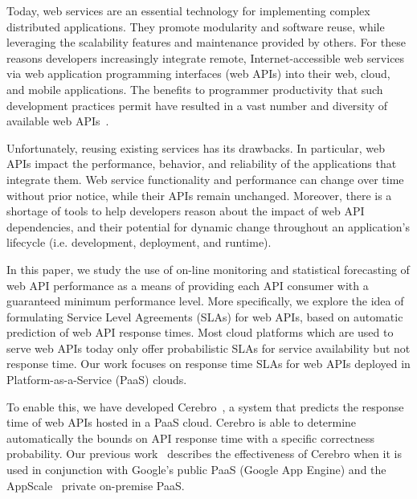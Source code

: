 Today, web services are an essential technology for implementing
complex distributed applications. They promote modularity and software reuse,
while leveraging the scalability features and maintenance 
provided by others. For these reasons developers increasingly integrate remote, 
Internet-accessible web services via web application programming interfaces (web APIs)
into their web, cloud, and mobile applications.  
The benefits to programmer productivity that such development practices
permit have resulted in a vast number and diversity of available web APIs~\cite{pweb}.

Unfortunately, reusing existing services has its drawbacks. In particular, 
web APIs impact the performance, behavior, and reliability of the applications
that integrate them.  Web service functionality and performance can change over time 
without prior notice, while their APIs remain unchanged.
Moreover, there is a shortage of tools to help developers 
reason about the impact of web API dependencies, and their potential for
dynamic change throughout an application's 
lifecycle (i.e. development, deployment, and runtime).  

In this paper, we study the use of on-line monitoring and statistical
forecasting of web API performance as a means of providing each API
consumer with a guaranteed minimum performance level.
More specifically, we explore the idea of formulating Service Level Agreements (SLAs)
for web APIs, based on automatic prediction of web API response times.
Most cloud platforms which are used to serve web APIs today only offer probabilistic
SLAs for service availability but not response time. 
Our work focuses on response time SLAs for web APIs deployed
in Platform-as-a-Service (PaaS) clouds.


To enable this, we have developed Cerebro~\cite{Jayathilaka:2015:RTS:2806777.2806842},
a system that
predicts the response time of web APIs hosted in a PaaS cloud. Cerebro is able to
determine automatically the bounds on API response time with a specific
correctness probability.
Our previous work~\cite{Jayathilaka:2015:RTS:2806777.2806842} describes the effectiveness of
Cerebro when it is used in conjunction with Google's public PaaS (Google
App Engine) and the AppScale~\cite{6488671} private on-premise PaaS.  

